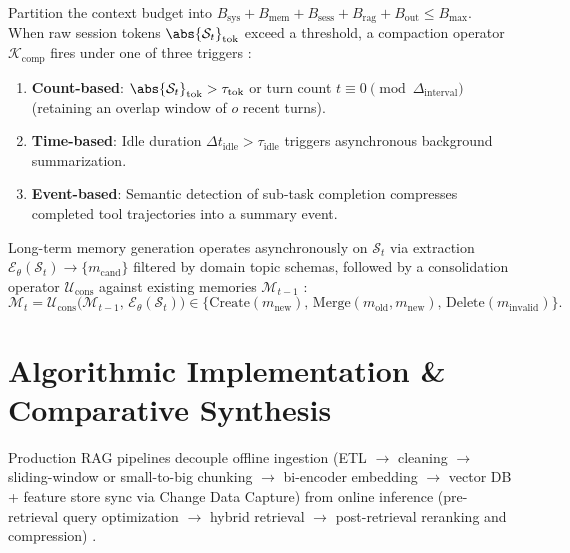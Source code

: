 \documentclass[../../../../master.tex]{subfiles}
\begin{document}
\begin{coremath}
Partition the context budget into $B_{\mathrm{sys}} + B_{\mathrm{mem}} + B_{\mathrm{sess}} + B_{\mathrm{rag}} + B_{\mathrm{out}} \le B_{\max}$. When raw session tokens $\abs{\mathcal{S}_t}_{\mathrm{tok}}$ exceed a threshold, a compaction operator $\mathcal{K}_{\mathrm{comp}}$ fires under one of three triggers :
\begin{enumerate}
  \item \textbf{Count-based}: $\abs{\mathcal{S}_t}_{\mathrm{tok}} > \tau_{\mathrm{tok}}$ or turn count $t \equiv 0 \pmod{\Delta_{\mathrm{interval}}}$ (retaining an overlap window of $o$ recent turns).
  \item \textbf{Time-based}: Idle duration $\Delta t_{\mathrm{idle}} > \tau_{\mathrm{idle}}$ triggers asynchronous background summarization.
  \item \textbf{Event-based}: Semantic detection of sub-task completion compresses completed tool trajectories into a summary event.
\end{enumerate}
Long-term memory generation operates asynchronously on $\mathcal{S}_t$ via extraction $\mathcal{E}_\theta(\mathcal{S}_t) \to \{m_{\mathrm{cand}}\}$ filtered by domain topic schemas, followed by a consolidation operator $\mathcal{U}_{\mathrm{cons}}$ against existing memories $\mathcal{M}_{t-1}$ :
\begin{equation}
  \mathcal{M}_t = \mathcal{U}_{\mathrm{cons}}\!\big(\mathcal{M}_{t-1},\, \mathcal{E}_\theta(\mathcal{S}_t)\big) \in \{\mathrm{Create}(m_{\mathrm{new}}),\, \mathrm{Merge}(m_{\mathrm{old}}, m_{\mathrm{new}}),\, \mathrm{Delete}(m_{\mathrm{invalid}})\}.
  \label{eq:rag:consolidation}
\end{equation}
\end{coremath}

\section{Algorithmic Implementation \& Comparative Synthesis}
\label{sec:rag:algorithms}

Production RAG pipelines decouple offline ingestion (ETL $\to$ cleaning $\to$ sliding-window or small-to-big chunking $\to$ bi-encoder embedding $\to$ vector DB + feature store sync via Change Data Capture) from online inference (pre-retrieval query optimization $\to$ hybrid retrieval $\to$ post-retrieval reranking and compression) .
\end{document}
